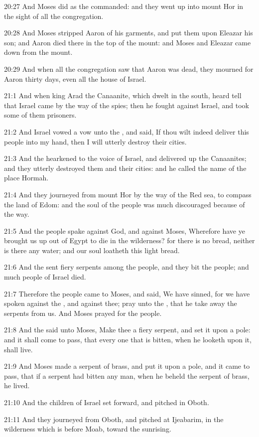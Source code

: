 20:27 And Moses did as the \LORD commanded: and they went up into mount Hor in the sight of all the congregation.

20:28 And Moses stripped Aaron of his garments, and put them upon Eleazar his son; and Aaron died there in the top of the mount: and Moses and Eleazar came down from the mount.

20:29 And when all the congregation saw that Aaron was dead, they mourned for Aaron thirty days, even all the house of Israel.

21:1 And when king Arad the Canaanite, which dwelt in the south, heard tell that Israel came by the way of the spies; then he fought against Israel, and took some of them prisoners.

21:2 And Israel vowed a vow unto the \LORD, and said, If thou wilt indeed deliver this people into my hand, then I will utterly destroy their cities.

21:3 And the \LORD hearkened to the voice of Israel, and delivered up the Canaanites; and they utterly destroyed them and their cities: and he called the name of the place Hormah.

21:4 And they journeyed from mount Hor by the way of the Red sea, to compass the land of Edom: and the soul of the people was much discouraged because of the way.

21:5 And the people spake against God, and against Moses, Wherefore have ye brought us up out of Egypt to die in the wilderness? for there is no bread, neither is there any water; and our soul loatheth this light bread.

21:6 And the \LORD sent fiery serpents among the people, and they bit the people; and much people of Israel died.

21:7 Therefore the people came to Moses, and said, We have sinned, for we have spoken against the \LORD, and against thee; pray unto the \LORD, that he take away the serpents from us. And Moses prayed for the people.

21:8 And the \LORD said unto Moses, Make thee a fiery serpent, and set it upon a pole: and it shall come to pass, that every one that is bitten, when he looketh upon it, shall live.

21:9 And Moses made a serpent of brass, and put it upon a pole, and it came to pass, that if a serpent had bitten any man, when he beheld the serpent of brass, he lived.

21:10 And the children of Israel set forward, and pitched in Oboth.

21:11 And they journeyed from Oboth, and pitched at Ijeabarim, in the wilderness which is before Moab, toward the sunrising.

